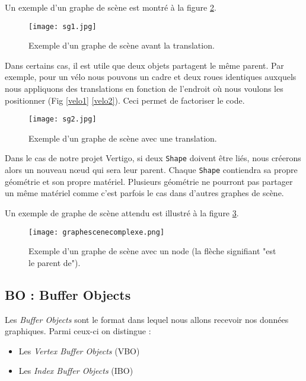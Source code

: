 \documentclass[11pt]{report}
\begin{document}
Un exemple d'un graphe de scène est montré à la figure \ref{graphscene}.



\begin{figure}[h!]
  \caption{Exemple d'un graphe de scène avant la translation.}
  \centering
  \label{velo1}
\texttt{[image: sg1.jpg]} 
\centering
\label{graphscene}
\end{figure}


Dans certains cas, il est utile que deux objets partagent le même parent. Par exemple, pour un vélo nous pouvons un cadre et deux roues identiques auxquels nous appliquons des translations en fonction de l'endroit où nous voulons les positionner (Fig \ref{velo1} \ref{velo2}). Ceci permet de factoriser le code.\\





\begin{figure}[h!]
  \caption{Exemple d'un graphe de scène avec une translation.}
  \centering
  \label{velo2}
\texttt{[image: sg2.jpg]} 
\centering
\label{graphscene}
\end{figure}


Dans le cas de notre projet Vertigo, si deux \texttt{Shape} doivent être liés, nous créerons alors un nouveau nœud qui sera leur parent. Chaque \texttt{Shape} contiendra sa propre géométrie et son propre matériel. Plusieurs géométrie ne pourront pas partager un même matériel comme c'est parfois le cas dans d'autres graphes de scène.

Un exemple de graphe de scène attendu est illustré à la figure \ref{graphescenecomplexe}. 

\begin{figure}[h!]
  \caption{Exemple d'un graphe de scène avec un node (la flèche signifiant "est le parent de").}
  \centering
\texttt{[image: graphescenecomplexe.png]} 
\label{graphescenecomplexe}
\end{figure}


\subsection{BO : Buffer Objects} 
\label{VBO}%
Les \textit{Buffer Objects} sont le format dans lequel nous allons recevoir nos données graphiques. Parmi ceux-ci on distingue :
\begin{itemize}
\item Les \textit{Vertex Buffer Objects} (VBO)
\item Les \textit{Index Buffer Objects} (IBO)
\end{itemize}
\end{document}
